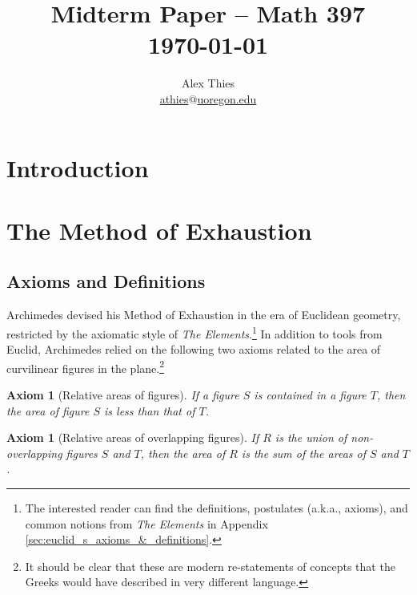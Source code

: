 \documentclass[letterpaper, 12pt]{amsart}
\newtheorem{axe}[thm]{Axiom}
\theoremstyle{definition}  %
\begin{document}
	\title{Midterm Paper  -- Math 397 \\ \today}
	\author{Alex Thies \\ \href{mailto:athies@uoregon.edu}{\lowercase{athies$@$uoregon.edu}}}

	\maketitle
	\newpage

	\tableofcontents
	\newpage

	\section{Introduction}
	\label{sec:introduction}
		
	\newpage

	\section{The Method of Exhaustion}
	\label{sec:the_method_of_exhaustion}
		\subsection{Axioms and Definitions}
		\label{sub:axioms_and_definitions}
		Archimedes devised his Method of Exhaustion in the era of Euclidean geometry, restricted by the axiomatic style of \textit{The Elements}.\footnote{The interested reader can find the definitions, postulates (a.k.a., axioms), and common notions from \textit{The Elements} in Appendix \ref{sec:euclid_s_axioms_&_definitions}.}
		In addition to tools from Euclid, Archimedes relied on the following two axioms related to the area of curvilinear figures in the plane.\footnote{It should be clear that these are modern re-statements of concepts that the Greeks would have described in very different language.}
		\begin{axe}[Relative areas of figures]
		If a figure $S$ is contained in a figure $T$, then the area of figure $S$ is less than that of $T$.
		\end{axe}

		\begin{axe}[Relative areas of overlapping figures]
		If $R$ is the union of non-overlapping figures $S$ and $T$, then the area of $R$ is the sum of the areas of $S$ and $T$.
		\end{axe}
\end{document}
